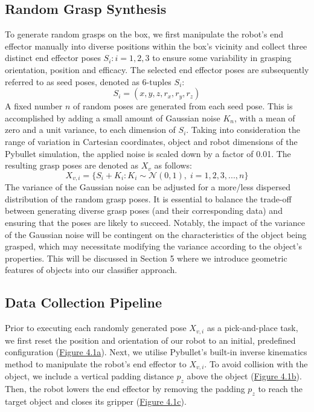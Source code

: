 \documentclass[11pt, a4paper]{report}
\begin{document}
\subsection{Random Grasp Synthesis}\label{sec:4.2.1}
To generate random grasps on the box, we first manipulate the robot's end effector manually into diverse positions within the box's vicinity and collect three distinct end effector poses $S_i:i=1,2,3$ to ensure some variability in grasping orientation, position and efficacy. The selected end effector poses are subsequently referred to as seed poses, denoted as 6-tuples $S_i$:
\begin{equation}
    S_i=(x,y,z,r_x,r_y,r_z)
\end{equation}
A fixed number $n$ of random poses are generated from each seed pose. This is accomplished by adding a small amount of Gaussian noise $K_n$, with a mean of zero and a unit variance, to each dimension of $S_i$. Taking into consideration the range of variation in Cartesian coordinates, object and robot dimensions of the Pybullet simulation, the applied noise is scaled down by a factor of 0.01. The resulting grasp poses are denoted as $X_v$ as follows:
\begin{equation}
    X_{v,i}=\Big\{S_i+K_i:K_i\sim\mathcal{N}(0,1),\;i=1,2,3,...,n\Big\}
\end{equation}
The variance of the Gaussian noise can be adjusted for a more/less dispersed distribution of the random grasp poses. It is essential to balance the trade-off between generating diverse grasp poses (and their corresponding data) and ensuring that the poses are likely to succeed. Notably, the impact of the variance of the Gaussian noise will be contingent on the characteristics of the object being grasped, which may necessitate modifying the variance according to the object's properties. This will be discussed in Section 5 where we introduce geometric features of objects into our classifier approach.
 

\newpage
\subsection{Data Collection Pipeline}\label{sec:4.2.2}
Prior to executing each randomly generated pose $X_{v,i}$ as a pick-and-place task, we first reset the position and orientation of our robot to an initial, predefined configuration (\hyperref[fig:4.1a]{Figure 4.1a}). Next, we utilise Pybullet's built-in inverse kinematics method to manipulate the robot's end effector to $X_{v,i}$. To avoid collision with the object, we include a vertical padding distance $p_z$ above the object (\hyperref[fig:4.1b]{Figure 4.1b}). Then, the robot lowers the end effector by removing the padding $p_z$ to reach the target object and closes its gripper (\hyperref[fig:4.1c]{Figure 4.1c}).
\end{document}
